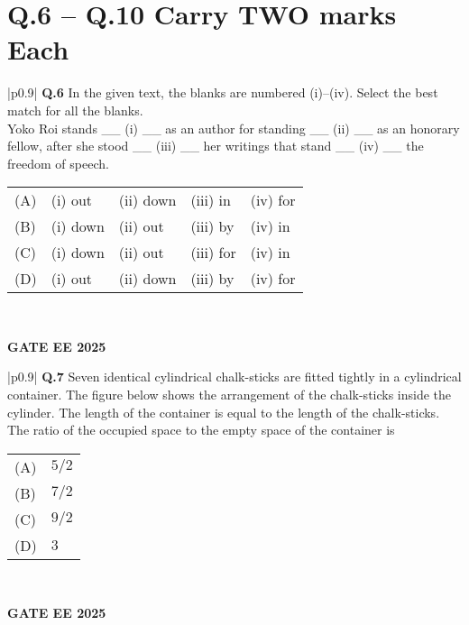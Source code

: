 \documentclass{article}
\begin{document}
\section*{Q.6 – Q.10 Carry TWO marks Each}

\begin{table}[h]
\centering
\begin{tabular}{|p{0.9\linewidth}|}
\hline
\textbf{Q.6} In the given text, the blanks are numbered (i)–(iv). Select the best match for all the blanks. \\
Yoko Roi stands \_\_ (i) \_\_ as an author for standing \_\_ (ii) \_\_ as an honorary fellow, after she stood \_\_ (iii) \_\_ her writings that stand \_\_ (iv) \_\_ the freedom of speech. \\
\hline
\begin{tabular}{lllll}
(A) & (i) out & (ii) down & (iii) in & (iv) for \\
(B) & (i) down & (ii) out & (iii) by & (iv) in \\
(C) & (i) down & (ii) out & (iii) for & (iv) in \\
(D) & (i) out & (ii) down & (iii) by & (iv) for \\
\end{tabular} \\
\hline
\end{tabular}
\end{table}
\textbf{GATE EE 2025}

\begin{table}[h]
\centering
\begin{tabular}{|p{0.9\linewidth}|}
\hline
\textbf{Q.7} Seven identical cylindrical chalk-sticks are fitted tightly in a cylindrical container. The figure below shows the arrangement of the chalk-sticks inside the cylinder. The length of the container is equal to the length of the chalk-sticks. The ratio of the occupied space to the empty space of the container is \\
\hline
\begin{tabular}{ll}
(A) & $5/2$ \\
(B) & $7/2$ \\
(C) & $9/2$ \\
(D) & $3$ \\
\end{tabular} \\
\hline
\end{tabular}
\end{table}
\textbf{GATE EE 2025}
\end{document}
